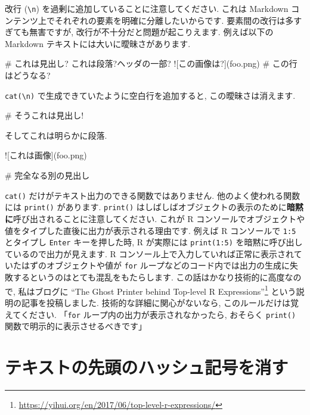 \documentclass[
  11pt,
  lualatex,
  ja=standard]{bxjsreport}
\newenvironment{Shaded}{\begin{snugshade}}{\end{snugshade}}
\newcommand{\AlertTok}[1]{\textcolor[rgb]{0.94,0.16,0.16}{#1}}
\newcommand{\FunctionTok}[1]{\textcolor[rgb]{0.00,0.00,0.00}{#1}}
\newcommand{\NormalTok}[1]{#1}
\renewcommand{\href}[2]{#2\footnote{\url{#1}}}
\begin{document}
改行 (\texttt{\textbackslash{}n}) を過剰に追加していることに注意してください. これは Markdown コンテンツ上でそれぞれの要素を明確に分離したいからです. 要素間の改行は多すぎても無害ですが, 改行が不十分だと問題が起こりえます. 例えば以下の Markdown テキストには大いに曖昧さがあります.

\begin{Shaded}
\begin{Highlighting}[]
\FunctionTok{\# これは見出し?}
\NormalTok{これは段落?ヘッダの一部?}
\AlertTok{![この画像は?](foo.png)}
\FunctionTok{\# この行はどうなる?}
\end{Highlighting}
\end{Shaded}

\texttt{cat(\textquotesingle{}\textbackslash{}n\textquotesingle{})} で生成できていたように空白行を追加すると, この曖昧さは消えます.

\begin{Shaded}
\begin{Highlighting}[]
\FunctionTok{\# そうこれは見出し!}

\NormalTok{そしてこれは明らかに段落.}

\AlertTok{![これは画像](foo.png)}

\FunctionTok{\# 完全なる別の見出し}
\end{Highlighting}
\end{Shaded}

\texttt{cat()} だけがテキスト出力のできる関数ではありません. 他のよく使われる関数には \texttt{print()} があります. \texttt{print()} はしばしばオブジェクトの表示のために\textbf{暗黙に}呼び出されることに注意してください. これが R コンソールでオブジェクトや値をタイプした直後に出力が表示される理由です. 例えば R コンソールで \texttt{1:5} とタイプし \texttt{Enter} キーを押した時, R が実際には \texttt{print(1:5)} を暗黙に呼び出しているので出力が見えます. R コンソール上で入力していれば正常に表示されていたはずのオブジェクトや値が \texttt{for} ループなどのコード内では出力の生成に失敗するというのはとても混乱をもたらします. この話はかなり技術的に高度なので, 私はブログに \href{https://yihui.org/en/2017/06/top-level-r-expressions/}{``The Ghost Printer behind Top-level R Expressions''} という説明の記事を投稿しました. 技術的な詳細に関心がないなら, このルールだけは覚えてください. 「\texttt{for} ループ内の出力が表示されなかったら, おそらく \texttt{print()} 関数で明示的に表示させるべきです」

\hypertarget{opts-comment}{%
\section{テキストの先頭のハッシュ記号を消す}\label{opts-comment}}
\end{document}
